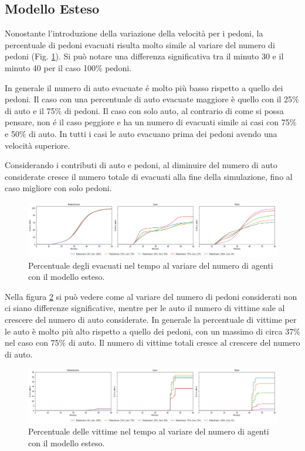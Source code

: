 \pagebreak

\subsection{Modello Esteso}
Nonostante l'introduzione della variazione della velocità per i pedoni, 
la percentuale di pedoni evacuati risulta molto simile al variare del numero di pedoni (Fig. \ref{fig:analisi-new-evacuated}). 
Si può notare una differenza significativa tra il minuto 30 e il minuto 40 per il caso 100\% pedoni.

In generale il numero di auto evacuate é molto più basso rispetto a quello dei pedoni. 
Il caso con una percentuale di auto evacuate maggiore è quello con il 25\% di auto e il 75\% di pedoni.
Il caso con solo auto, al contrario di come si possa pensare, non é il caso peggiore e ha un numero di evacuati simile ai casi 
con 75\% e 50\% di auto.
%
In tutti i casi le auto evacuano prima dei pedoni avendo una velocità superiore.

Considerando i contributi di auto e pedoni, al diminuire del numero di auto considerate cresce il numero totale di evacuati alla fine della simulazione,
fino al caso migliore con solo pedoni.

\begin{figure}[ht]
    \centering
    \includegraphics[width=\textwidth]{images/analisi/new-evacuated.png}
    \caption{Percentuale degli evacuati nel tempo al variare del numero di agenti con il modello esteso.}
    \label{fig:analisi-new-evacuated}
\end{figure}

Nella figura \ref{fig:analisi-new-casualties} si può vedere come al variare del numero di pedoni considerati 
non ci siano differenze significative, mentre per le auto il numero di vittime sale al crescere del numero di auto considerate.
In generale la percentuale di vittime per le auto è molto più alto rispetto a quello dei pedoni, con un massimo di circa 37\% nel caso con 75\% di auto. 
%
Il numero di vittime totali cresce al crescere del numero di auto.

\begin{figure}[ht]
    \centering
    \includegraphics[width=\textwidth]{images/analisi/new-casualties.png}
    \caption{Percentuale delle vittime nel tempo al variare del numero di agenti con il modello esteso.}
    \label{fig:analisi-new-casualties}
\end{figure}

